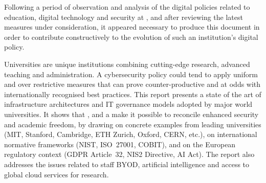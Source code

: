 
\noindent
Following a period of observation and analysis of the digital policies related to education, digital technology and security at , and after reviewing the latest measures under
consideration, it appeared necessary to produce this document in order to
contribute constructively to the evolution of such an institution's digital policy.

\medskip
\noindent
Universities are unique institutions combining cutting-edge research,
advanced teaching and administration. A cybersecurity policy
could tend to apply uniform and over restrictive measures that can
prove counter-productive and at odds with internationally recognised
best practices. This report presents a state of the art of
infrastructure architectures and IT governance models adopted by
major world universities. It shows that ,
 and a 
make it possible to reconcile enhanced security and academic freedom, by
drawing on concrete examples from leading universities
(MIT, Stanford, Cambridge, ETH Zurich, Oxford, CERN, etc.), on
international normative frameworks (NIST, ISO~27001, COBIT), and on the
European regulatory context (GDPR Article~32, NIS2 Directive, AI Act).
The report also addresses the issues related to staff BYOD,
artificial intelligence and access to global cloud services
for research.
